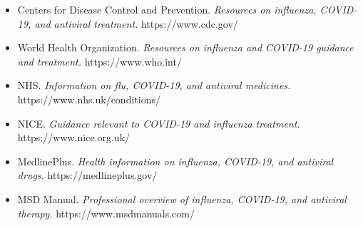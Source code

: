 \begin{itemize}
    \item Centers for Disease Control and Prevention. \textit{Resources on influenza, COVID-19, and antiviral treatment.} https://www.cdc.gov/
    \item World Health Organization. \textit{Resources on influenza and COVID-19 guidance and treatment.} https://www.who.int/
    \item NHS. \textit{Information on flu, COVID-19, and antiviral medicines.} https://www.nhs.uk/conditions/
    \item NICE. \textit{Guidance relevant to COVID-19 and influenza treatment.} https://www.nice.org.uk/
    \item MedlinePlus. \textit{Health information on influenza, COVID-19, and antiviral drugs.} https://medlineplus.gov/
    \item MSD Manual. \textit{Professional overview of influenza, COVID-19, and antiviral therapy.} https://www.msdmanuals.com/
\end{itemize}
